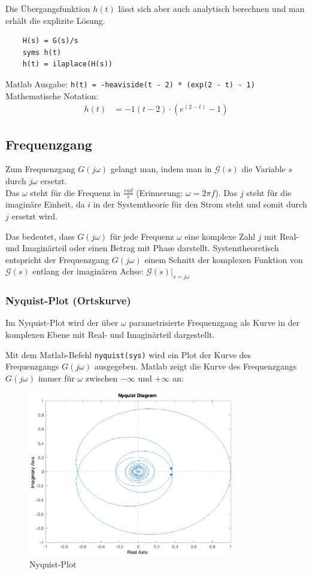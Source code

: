 Die Übergangsfunktion $h(t)$ lässt sich aber auch analytisch berechnen und man erhält die explizite Lösung.

\begin{verbatim}
    H(s) = G(s)/s
    syms h(t)
    h(t) = ilaplace(H(s))
\end{verbatim} 

Matlab Ausgabe: \texttt{h(t) = -heaviside(t - 2) * (exp(2 - t) - 1)}\\
Mathematische Notation: 
\begin{align*}
    h(t) &= -1(t-2)\cdot(e^{(2-t)}-1)
\end{align*}


\subsection{Frequenzgang}
Zum Frequenzgang $G(j \omega)$ gelangt man, indem man in $\mathcal{G}(s)$ die Variable $s$ durch $j \omega$ ersetzt.\\
Das $\omega$ steht für die Frequenz in $\frac{rad}{s}$ (Erinnerung: $\omega = 2\pi f$). Das $j$ steht für die imaginäre Einheit, da $i$ in der Systemtheorie für den Strom steht und somit durch $j$ ersetzt wird.

Das bedeutet, dass $G(j \omega)$ für jede Frequenz $\omega$ eine komplexe Zahl $j$ mit Real- und Imaginärteil oder einen Betrag mit Phase darstellt.
Systemtheoretisch entspricht der Frequenzgang $G(j\omega)$ einem Schnitt der komplexen Funktion von $\mathcal{G}(s)$ entlang der imaginären Achse: $\mathcal{G}(s)|_{s = j\omega}$

\subsubsection{Nyquist-Plot (Ortskurve)}
Im Nyquist-Plot wird der über $\omega$ parametrisierte Frequenzgang als Kurve in der komplexen Ebene mit Real- und Imaginärteil dargestellt.

Mit dem Matlab-Befehl \texttt{nyquist(sys)} wird ein Plot der Kurve des Frequenzgangs $G(j\omega)$ ausgegeben. 
Matlab zeigt die Kurve des Frequenzgangs $G(j\omega)$ immer für $\omega$ zwischen $- \infty$ und $+ \infty$ an:

\begin{figure}[H]
    \label{fig:nyquist}
    \centering
    \includegraphics[width=0.8\textwidth]{Bilder/NyquistPT1Tt.eps}
    \caption{Nyquist-Plot}
 \end{figure}

